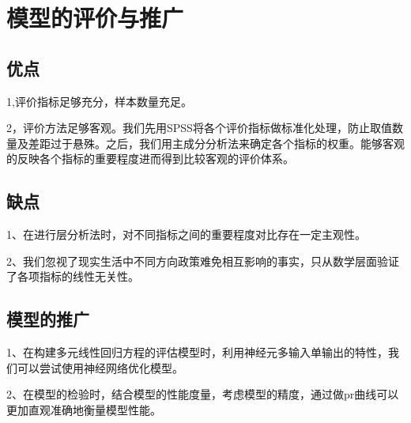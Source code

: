 \documentclass[withoutpreface,bwprint]{cumcmthesis} %
\begin{document}
\section{模型的评价与推广}
\subsection{优点}

1,评价指标足够充分，样本数量充足。

2，评价方法足够客观。我们先用SPSS将各个评价指标做标准化处理，防止取值数量及差距过于悬殊。之后，我们用主成分分析法来确定各个指标的权重。能够客观的反映各个指标的重要程度进而得到比较客观的评价体系。

\subsection{缺点}

1、在进行层分析法时，对不同指标之间的重要程度对比存在一定主观性。

2、我们忽视了现实生活中不同方向政策难免相互影响的事实，只从数学层面验证了各项指标的线性无关性。

\subsection{模型的推广}

1、在构建多元线性回归方程的评估模型时，利用神经元多输入单输出的特性，我们可以尝试使用神经网络优化模型。

2、在模型的检验时，结合模型的性能度量，考虑模型的精度，通过做pr曲线可以更加直观准确地衡量模型性能。





\newpage
\end{document}
